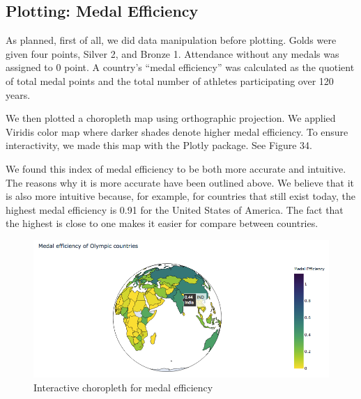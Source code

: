 \documentclass[12pt]{article}
\begin{document}
\subsection{Plotting: Medal Efficiency}
As planned, first of all, we did data manipulation before plotting. Golds were given four points, Silver 2, and Bronze 1. Attendance without any medals was assigned to 0 point. A country’s “medal efficiency” was calculated as the quotient of total medal points and the total number of athletes participating over 120 years. 

We then plotted a choropleth map using orthographic projection. We applied Viridis color map where darker shades denote higher medal efficiency. To ensure interactivity, we made this map with the Plotly package. See Figure 34.

We found this index of medal efficiency to be both more accurate and intuitive. The reasons why it is more accurate have been outlined above. We believe that it is also more intuitive because, for example, for countries that still exist today, the highest medal efficiency is 0.91 for the United States of America. The fact that the highest is close to one makes it easier for compare between countries. 

\begin{figure}[!b]
    \centering
    \includegraphics[scale=0.55]{pics/g-3-1.png}
    \caption{Interactive choropleth for medal efficiency}
    \label{fig:my_label}
\end{figure}
\end{document}
